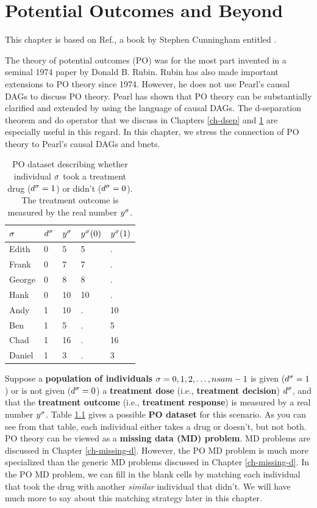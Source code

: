 
\chapter{Potential Outcomes and Beyond}
\label{ch-pot-out}
This chapter
is based on Ref.\cite{book-mixtape},
a book by Stephen Cunningham entitled
.

The theory of potential
outcomes (PO) was for the most part
invented in a seminal
1974 paper by Donald B. Rubin. Rubin
has also
made important extensions
to PO theory since 1974. However, he
does not
use Pearl's causal DAGs to discuss PO theory.
Pearl has shown that PO theory
can be substantially clarified
and extended by using
the language of causal DAGs.
The d-separation theorem and do operator
that we discuss in  Chapters \ref{ch-dsep}
and \ref{ch-pot-out}
are especially
useful in this regard.
In this chapter, we stress the
connection
of PO theory to
Pearl's causal DAGs
and bnets.

\begin{table}[h!]
\centering
\begin{tabular}{|l|l|l|l|l|}
\hline
\rowcolor[HTML]{ECF4FF}
$\sigma$ & $ d^\sigma$ & $ y^\sigma$ & $ y^\sigma(0)$ & $ y^\sigma(1)$ \\ \hline
Edith & 0 & 5 & 5 & . \\ \hline
Frank & 0 & 7 & 7 & . \\ \hline
George & 0 & 8 & 8 & . \\ \hline
Hank & 0 & 10 & 10 & . \\ \hline
Andy & \cellcolor[HTML]{FFFFC7}1 & 10 & . & 10 \\ \hline
Ben & \cellcolor[HTML]{FFFFC7}1 & 5 & . & 5 \\ \hline
Chad & \cellcolor[HTML]{FFFFC7}1 & 16 & . & 16 \\ \hline
Daniel & \cellcolor[HTML]{FFFFC7}1 & 3 & . & 3 \\ \hline
\end{tabular}
\caption{PO dataset describing whether
individual $\sigma$
took a treatment drug ($d^\sigma=1$)
or didn't ($d^\sigma=0$).
The
treatment outcome
is measured by the real number $y^\sigma$.}
\label{tab-pot-out-missing}
\end{table}

Suppose a {\bf population
of individuals} $\sigma=0,1,2, \ldots, nsam-1$
is given ($d^\sigma=1$) or is
not given ($d^\sigma=0$)
a {\bf treatment dose} (i.e., {\bf treatment decision}) $d^\sigma$,
and that
the
 {\bf treatment outcome} (i.e., {\bf treatment response})
is measured by
a real number $y^\sigma$.
Table \ref{tab-pot-out-missing}
gives a possible {\bf PO dataset}
for this scenario.
As you
can see from
that table,
each individual
either takes a drug or
doesn't,
but not both.
PO theory
can be viewed as a
 {\bf  missing
data (MD) problem}. MD problems are
discussed in
 Chapter \ref{ch-missing-d}.
However, the PO MD problem
is much more specialized
than the generic MD problems
discussed in Chapter \ref{ch-missing-d}.
In the PO MD
problem, we can
fill
in the blank cells
by matching
each individual
that took
the drug with
another {\it similar}
individual that didn't.
We will have much
more to say about
this matching
strategy later in this chapter.

